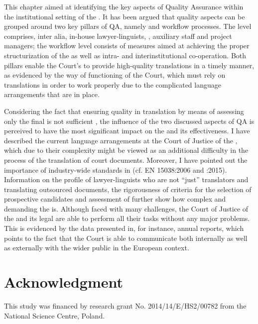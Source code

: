 \documentclass[output=paper]{langsci/langscibook}
\begin{document}
This chapter aimed at identifying the key aspects of Quality Assurance within the institutional setting of the . It has been argued that quality aspects can be grouped around two key pillars of QA, namely  and workflow processes. The  level comprises, inter alia, in-house lawyer-linguists, , auxiliary staff and project managers; the workflow level consists of measures aimed at achieving the proper structurization of the  as well as intra- and interinstitutional co-operation. Both pillars enable the Court’s  to provide high-quality translations in a timely manner, as evidenced by the way of functioning of the Court, which must rely on translations in order to work properly due to the complicated language arrangements that are in place.

Considering the fact that ensuring quality in translation by means of assessing only the final  is not sufficient \citep[279]{Lušicky2017}, the influence of the two discussed aspects of QA is perceived to have the most significant impact on the  and its effectiveness. I have described the current language arrangements at the Court of Justice of the , which due to their complexity might be viewed as an additional difficulty in the process of the translation of court documents. Moreover, I have pointed out the importance of industry-wide standards in  (cf. EN 15038:2006 \nocite{EN2006} and \citeauthor{ISO2015}:2015). Information on the profile of lawyer-linguists who are not “just” translators and  translating outsourced documents, the rigorousness of criteria for the selection of prospective candidates and assessment of  further show how complex and demanding the  is. Although faced with many challenges, the Court of Justice of the  and its legal  are able to perform all their tasks without any major problems. This is evidenced by the data presented in, for instance, annual reports, which points to the fact that the Court is able to communicate both internally as well as externally with the wider public in the European context.
 
\section*{Acknowledgment}
This study was financed by research grant No. 2014/14/E/HS2/00782 from the National Science Centre, Poland.

 
\sloppy
\printbibliography[heading=subbibliography,notkeyword=this] 
\end{document}
